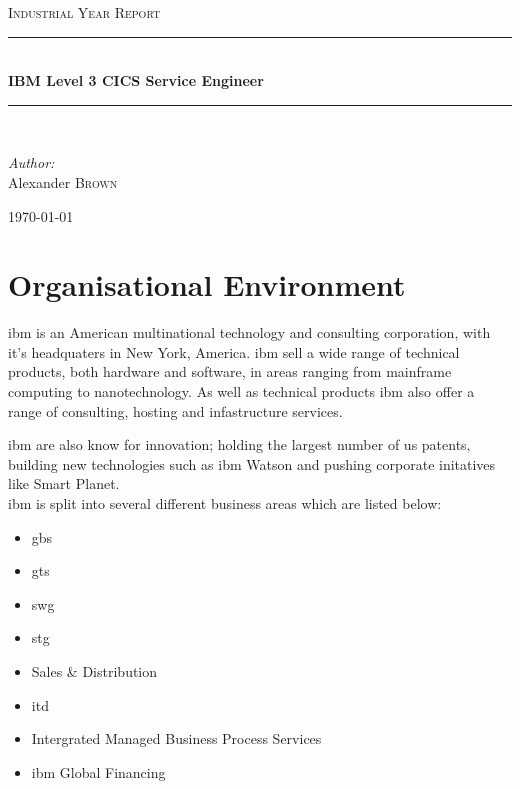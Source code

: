 \documentclass[a4paper,11pt]{report}
\newcommand{\HRule}{\rule{\linewidth}{0.5mm}}
\begin{document}
\begin{titlepage}

\begin{center}



\textsc{\Large Industrial Year Report}\\[0.5cm]


\HRule \\[0.4cm]
{ \huge \bfseries IBM Level 3 CICS Service Engineer}\\[0.4cm]

\HRule \\[1.5cm]

\begin{minipage}{0.4\textwidth}
\begin{flushleft} \large
\emph{Author:}\\
Alexander \textsc{Brown}
\end{flushleft}
\end{minipage}

\vfill

{\large \today}

\end{center}

\end{titlepage}

\tableofcontents

\chapter{Organisational Environment}

\Gls{ibm} is an American multinational technology and consulting corporation, with it's headquaters
in New York, America. \Gls{ibm} sell a wide range of technical products, both hardware and
software, in areas ranging from mainframe computing to nanotechnology. As well as technical 
products \gls{ibm} also offer a range of consulting, hosting and infastructure services.

\Gls{ibm} are also know for innovation; holding the largest number of \gls{us} patents, building
new technologies such as \gls{ibm} Watson and pushing corporate initatives like Smart Planet. \\



\Gls{ibm} is split into several different business areas which are listed below:

\begin{itemize}
\item \Gls{gbs}
\item \Gls{gts}
\item \Gls{swg}
\item \Gls{stg}
\item Sales \& Distribution
\item \Gls{itd}
\item Intergrated Managed Business Process Services
\item \Gls{ibm} Global Financing
\end{itemize}
\end{document}
